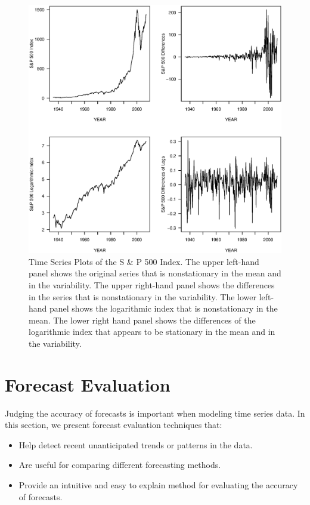 \begin{figure}[htp]
  \begin{center}
    \includegraphics[width=1\textwidth]{Chapter7Trend/SandPTS.eps}
    \caption{\label{F7:SandPTS} \small Time Series Plots of the S \& P 500 Index. The upper
left-hand panel shows the original series that is nonstationary in
the mean and in the variability. The upper right-hand panel shows
the differences in the series that is nonstationary in the
variability. The lower left-hand panel shows the logarithmic index
that is nonstationary in the mean. The lower right hand panel shows
the differences of the logarithmic index that appears to be
stationary in the mean and in the variability.}
  \end{center}
\end{figure}

\linejed

\section{Forecast Evaluation}

Judging the accuracy of forecasts is important when modeling time series
data. In this section, we present forecast evaluation techniques that:

\begin{itemize}
\item Help detect recent unanticipated trends or patterns in the data.

\item Are useful for comparing different forecasting methods.

\item Provide an intuitive and easy to explain method for evaluating the
accuracy of forecasts.
\end{itemize}

